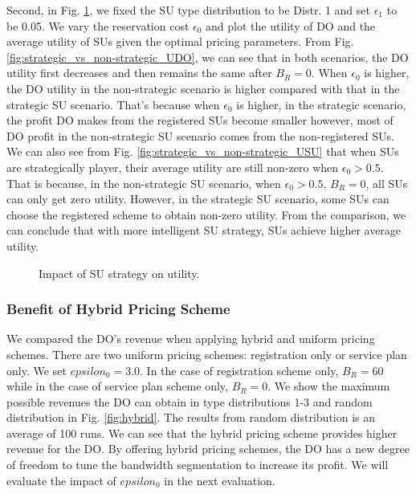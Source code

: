 \documentclass[journal]{IEEEtran}
\begin{document}
Second, in Fig. \ref{fig:strategic_vs_non-strategic}, we fixed the SU type distribution to be Distr. 1 and set $\epsilon_1$ to be 0.05. We vary the reservation cost $\epsilon_0$ and plot the utility of DO and the average utility of SUs given the optimal pricing parameters. From Fig. \ref{fig:strategic_vs_non-strategic_UDO}, we can see that in both scenarios, the DO utility first decreases and then remains the same after $B_R=0$. When $\epsilon_0$ is higher, the DO utility in the non-strategic scenario is higher compared with that in the strategic SU scenario. That's because when $\epsilon_0$ is higher, in the strategic scenario, the profit DO makes from the registered SUs become smaller however, most of DO profit in the non-strategic SU scenario comes from the non-registered SUs.
We can also see from Fig. \ref{fig:strategic_vs_non-strategic_USU} that when SUs are strategically player, their average utility are still non-zero when $\epsilon_0>0.5$. That is because, in the non-strategic SU scenario, when $\epsilon_0>0.5$, $B_R=0$, all SUs can only get zero utility. However, in the strategic SU scenario, some SUs can choose the registered scheme to obtain non-zero utility.
From the comparison, we can conclude that with more intelligent SU strategy, SUs achieve higher average utility.
\begin{figure}[t]
\centering
{}\caption{Impact of SU strategy on utility.}
\label{fig:strategic_vs_non-strategic}
\vspace{-0.0cm}
\end{figure}

\subsubsection{Benefit of Hybrid Pricing Scheme}

We compared the DO's revenue when applying hybrid and uniform pricing schemes. There are two uniform pricing schemes: registration only or service plan only. We set $epsilon_0=3.0$. In the case of registration scheme only, $B_R=60$ while in the case of service plan scheme only, $B_R=0$. We show the maximum possible revenues the DO can obtain in type distributions 1-3 and random distribution in Fig. \ref{fig:hybrid}. The results from random distribution is an average of 100 runs. We can see that the hybrid pricing scheme provides higher revenue for the DO. By offering hybrid pricing schemes, the DO has a new degree of freedom to tune the bandwidth segmentation to increase its profit. We will evaluate the impact of $epsilon_0$ in the next evaluation.
\end{document}
